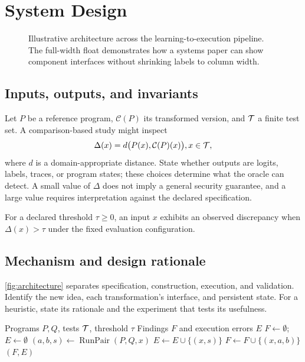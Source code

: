\section{System Design}
\label{sec:design}
\begin{figure}[t]
  \centering
  
  \caption{Illustrative architecture across the learning-to-execution
  pipeline. The full-width float demonstrates how a systems paper can
  show component interfaces without shrinking labels to column width.}
  \label{fig:architecture}
\end{figure}

\subsection{Inputs, outputs, and invariants}
Let $P$ be a reference program, $\mathcal{C}(P)$ its transformed version,
and $\mathcal{T}$ a finite test set. A comparison-based study might inspect
\begin{equation}
  \Delta(x)=d\bigl(P(x),\mathcal{C}(P)(x)\bigr),
   x\in\mathcal{T},
  \label{eq:deviation}
\end{equation}
where $d$ is a domain-appropriate distance. State whether outputs are
logits, labels, traces, or program states; these choices determine what
the oracle can detect. A small value of $\Delta$ does not imply a general
security guarantee, and a large value requires interpretation against the
declared specification.

\begin{definition}
For a declared threshold $\tau\geq0$, an input $x$ exhibits an observed
discrepancy when $\Delta(x)>\tau$ under the fixed evaluation configuration.
\end{definition}

\subsection{Mechanism and design rationale}
\autoref{fig:architecture} separates specification, construction, execution,
and validation. Identify the new idea, each transformation's interface,
and persistent state. For a heuristic, state its rationale and the
experiment that tests its usefulness.

\begin{algorithm}[t]
  \caption{Illustrative discrepancy collection}
  \label{alg:collect}
  \begin{algorithmic}[1]
    \Require Programs $P,Q$, tests $\mathcal{T}$, threshold $\tau$
    \Ensure Findings $F$ and execution errors $E$
    \State $F\gets\emptyset$; $E\gets\emptyset$
      \State $(a,b,s)\gets\operatorname{RunPair}(P,Q,x)$
        \State $E\gets E\cup\{(x,s)\}$
        \State $F\gets F\cup\{(x,a,b)\}$
      \EndIf
    \EndFor
    \State \Return $(F,E)$
  \end{algorithmic}
\end{algorithm}


